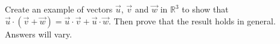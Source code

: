 {Create an example of vectors $\vec u$, $\vec v$ and $\vec w$ in $\mathbb{R}^3$ to show that $\vec u\cdot (\vec v+\vec w) = \vec u\cdot \vec v + \vec u\cdot \vec w$. Then prove that the result holds in general.
}
{Answers will vary.
}
